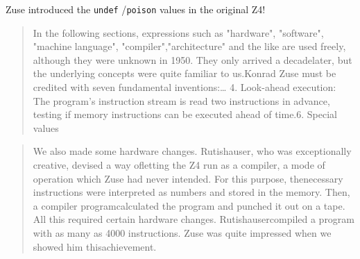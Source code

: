 Zuse introduced the \texttt{undef}
/\texttt{poison}
 values in the original Z4!\begin{quotation}
In the following sections, expressions such as "hardware", "software", "machine language", "compiler","architecture" and the like are used freely, although they were unknown in 1950. They only arrived a decadelater, but the underlying concepts were quite familiar to us.Konrad Zuse must be credited with seven fundamental inventions:\dots
4. Look-ahead execution: The program's instruction stream is read two instructions in advance, testing if memory instructions can be executed ahead of time.6. Special values\end{quotation}
\begin{quotation}
    We also made some hardware changes. Rutishauser, who was exceptionally creative, devised a way ofletting the Z4 run as a compiler, a mode of operation which Zuse had never intended. For this purpose, thenecessary instructions were interpreted as numbers and stored in the memory. Then, a compiler programcalculated the program and punched it out on a tape. All this required certain hardware changes. Rutishausercompiled a program with as many as 4000 instructions. Zuse was quite impressed when we showed him thisachievement.\end{quotation}

